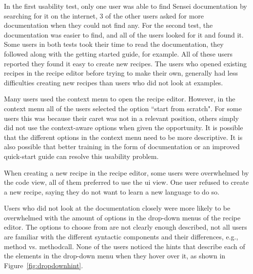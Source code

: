 In the first usability test, only one user was able to find Sensei documentation by searching for it on the internet, 3 of the other users asked for more documentation when they could not find any.
For the second test, the documentation was easier to find, and all of the users looked for it and found it.
Some users in both tests took their time to read the documentation, they followed along with the getting started guide, for example.
All of these users reported they found it easy to create new recipes.
The users who opened existing recipes in the recipe editor before trying to make their own, generally had less difficulties creating new recipes than users who did not look at examples.

Many users used the context menu to open the recipe editor.
However, in the context menu all of the users selected the option ``start from scratch".
For some users this was because their caret was not in a relevant position, others simply did not use the context-aware options when given the opportunity.
It is possible that the different options in the context menu need to be more descriptive.
It is also possible that better training in the form of documentation or an improved quick-start guide can resolve this usability problem.

When creating a new recipe in the recipe editor, some users were overwhelmed by the code view, all of them preferred to use the \gls{ui} view.
One user refused to create a new recipe, saying they do not want to learn a new language to do so.

Users who did not look at the documentation closely were more likely to be overwhelmed with the amount of options in the drop-down menus of the recipe editor.
The options to choose from are not clearly enough described, not all users are familiar with the different syntactic components and their differences, e.g., method vs. methodcall.
None of the users noticed the hints that describe each of the elements in the drop-down menu when they hover over it, as shown in Figure~\ref{fig:dropdownhint}.

